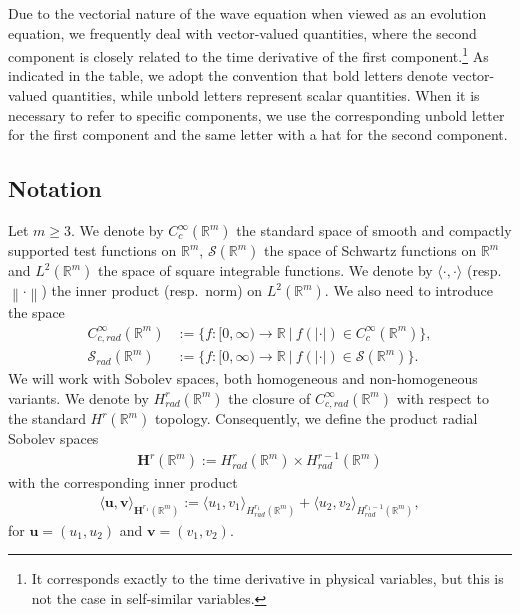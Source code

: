 \documentclass[12pt,reqno]{amsart}
\theoremstyle{plain}
\theoremstyle{remark}
\theoremstyle{plain}
\theoremstyle{definition}
\numberwithin{equation}{section}
\numberwithin{equation}{section}
\def\R{{\mathbb R}}
\newcommand{\norm}[1]{\left\|#1\right\|}
\begin{document}
	Due to the vectorial nature of the wave equation when viewed as an evolution equation, we frequently deal with vector-valued quantities, where the second component is closely related to the time derivative of the first component.\footnote{It corresponds exactly to the time derivative in physical variables, but this is not the case in self-similar variables.} As indicated in the table, we adopt the convention that bold letters denote vector-valued quantities, while unbold letters represent scalar quantities. When it is necessary to refer to specific components, we use the corresponding unbold letter for the first component and the same letter with a hat for the second component.
	
	\subsection{Notation}\label{Notation}
	Let $m\geq 3$. We denote by $C_c^{\infty}(\R^m)$ the standard space of smooth and compactly supported test functions on $\R^m$, $\mathscr{S}(\R^m)$ the space of Schwartz functions on $\R^m$ and $L^2(\R^m)$ the space of square integrable functions. We denote by $\langle\cdot,\cdot\rangle$ (resp. $\norm{\cdot}$) the inner product (resp.~norm) on $L^2(\R^m)$. We also need to introduce the space 
	\begin{align*}
		C_{c,rad}^\infty(\R^m) &:= \{ f : [0,\infty) \rightarrow \mathbb{R} ~ \vert ~ f(\lvert\cdot \rvert) \in C_c^{\infty}(\R^m)  \},\\
		\mathscr{S}_{rad}(\R^m) &:= \{ f : [0,\infty) \rightarrow \mathbb{R} ~ \vert ~ f(\left|\cdot\right|) \in \mathscr{S}(\R^m)  \}.
	\end{align*}
	We will work with Sobolev spaces, both homogeneous and non-homogeneous variants. We denote by $H^r_{rad}(\R^m)$ the closure of $C_{c,rad}^\infty(\R^m)$ with respect to the standard $H^r(\R^m)$ topology. Consequently, we define the product radial Sobolev spaces
	\begin{align*}
	    \mathbf{H}^{r}(\R^m):={H}_{rad}^{r}(\R^m)\times {H}_{rad}^{r-1}(\R^m)
	\end{align*}
	with the corresponding inner product
	\begin{align*}
	    \langle \mathbf{u},\mathbf{v}\rangle_{\mathbf{H}^{r_1}(\R^m)}:=\langle u_1,v_1\rangle_{{H}^{r_1}_{rad}(\R^m)}+\langle u_2,v_2\rangle_{{H}^{r_1-1}_{rad}(\R^m)},
	\end{align*}
	for $\mathbf{u}=(u_1,u_2)$ and $\mathbf{v}=(v_1,v_2).$
	
\end{document}
